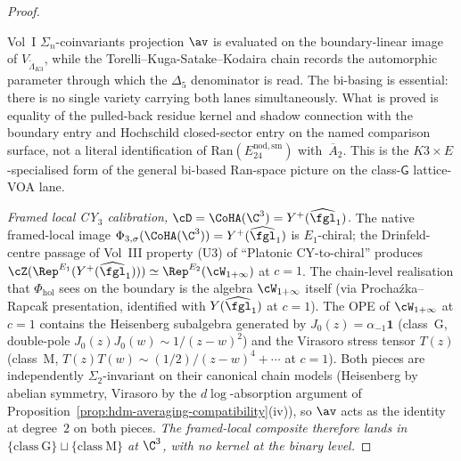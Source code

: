 \begin{proof}
\begin{remark}
Vol~I $\Sigma_n$-coinvariants projection $\av$ is evaluated on the
boundary-linear image of $V_{\widetilde\Lambda_{K3}}$, while the
Torelli--Kuga-Satake--Kodaira chain records the automorphic parameter
through which the $\Delta_5$ denominator is read. The bi-basing is
essential: there is no single variety carrying both lanes
simultaneously. What is proved is equality of the pulled-back residue
kernel and shadow connection with the boundary entry and Hochschild
closed-sector entry on the named comparison surface, not
a literal identification of $\mathrm{Ran}(E_{24}^{\mathrm{nod,sm}})$
with~$\overline{A}_2$. This is the $K3 \times E$-specialised form of
the general bi-based Ran-space picture on the class-$\mathsf{G}$
lattice-VOA lane.
\end{remark}

\textit{Framed local CY$_3$ calibration,
$\cD = \CoHA(\C^3) = Y^+(\widehat{\fgl}_1)$.}
The native framed-local image $\Phi_{3,\sigma}(\CoHA(\C^3)) =
Y^+(\widehat{\fgl}_1)$ is
$E_1$-chiral; the Drinfeld-centre passage of Vol~III property
\textup{(U3)} of ``Platonic CY-to-chiral'' produces
$\cZ(\Rep^{E_1}(Y^+(\widehat{\fgl}_1))) \simeq \Rep^{E_2}(\cW_{1+\infty})$
at $c = 1$. The chain-level realisation that $\Phi_{\mathrm{hol}}$
sees on the boundary is the algebra $\cW_{1+\infty}$ itself
\textup{(}via Procha\'zka--Rapca\'k presentation, identified with
$Y(\widehat{\fgl}_1)$ at $c=1$\textup{).} The OPE of $\cW_{1+\infty}$
at $c = 1$ contains the Heisenberg subalgebra generated by
$J_0(z) = \alpha_{-1} \mathbf{1}$ \textup{(}class~G, double-pole
$J_0(z) J_0(w) \sim 1/(z-w)^2$\textup{)} and the Virasoro stress
tensor $T(z)$ \textup{(}class~M, $T(z)T(w) \sim (1/2)/(z-w)^4
+ \cdots$ at $c = 1$\textup{).} Both pieces are independently
$\Sigma_2$-invariant on their canonical chain models
\textup{(}Heisenberg by abelian symmetry, Virasoro by the
$d\log$-absorption argument of
Proposition~\textup{\ref{prop:hdm-averaging-compatibility}}\textup{(iv)}\textup{),}
so $\av$ acts as the identity at degree~$2$ on both pieces.
\textit{The framed-local composite therefore lands in
$\{\mathrm{class~G}\} \sqcup \{\mathrm{class~M}\}$ at $\C^3$, with
no kernel at the binary level.}


\end{proof}
